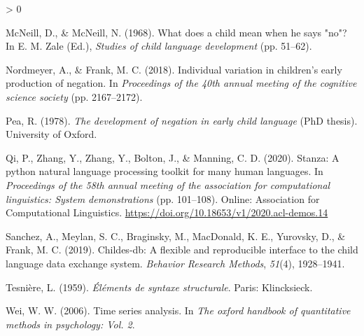 \documentclass[
  english,
  man,floatsintext]{apa6}
\newlength{\cslhangindent}
\newenvironment{CSLReferences}[2] %
 {%
  \setlength{\parindent}{0pt}
  \ifodd #1 \everypar{\setlength{\hangindent}{\cslhangindent}}\ignorespaces\fi
  \ifnum #2 > 0
  \setlength{\parskip}{#2\baselineskip}
  \fi
 }%
 {}
\begin{document}
\begin{CSLReferences}{1}{0}
\leavevmode\hypertarget{ref-mcneill1968}{}%
McNeill, D., \& McNeill, N. (1968). What does a child mean when he says "no"? In E. M. Zale (Ed.), \emph{Studies of child language development} (pp. 51--62).

\leavevmode\hypertarget{ref-nordmeyer2018individual}{}%
Nordmeyer, A., \& Frank, M. C. (2018). Individual variation in children's early production of negation. In \emph{Proceedings of the 40th annual meeting of the cognitive science society} (pp. 2167--2172).

\leavevmode\hypertarget{ref-pea1978}{}%
Pea, R. (1978). \emph{The development of negation in early child language} (PhD thesis). University of Oxford.

\leavevmode\hypertarget{ref-qi-etal-2020-stanza}{}%
Qi, P., Zhang, Y., Zhang, Y., Bolton, J., \& Manning, C. D. (2020). {S}tanza: A python natural language processing toolkit for many human languages. In \emph{Proceedings of the 58th annual meeting of the association for computational linguistics: System demonstrations} (pp. 101--108). Online: Association for Computational Linguistics. \url{https://doi.org/10.18653/v1/2020.acl-demos.14}

\leavevmode\hypertarget{ref-sanchez2019childes}{}%
Sanchez, A., Meylan, S. C., Braginsky, M., MacDonald, K. E., Yurovsky, D., \& Frank, M. C. (2019). Childes-db: A flexible and reproducible interface to the child language data exchange system. \emph{Behavior Research Methods}, \emph{51}(4), 1928--1941.

\leavevmode\hypertarget{ref-dg}{}%
Tesnière, L. (1959). \emph{{É}l{é}ments de syntaxe structurale}. Paris: Klincksieck.

\leavevmode\hypertarget{ref-wei2006time}{}%
Wei, W. W. (2006). Time series analysis. In \emph{The oxford handbook of quantitative methods in psychology: Vol. 2}.

\end{CSLReferences}
\end{document}
